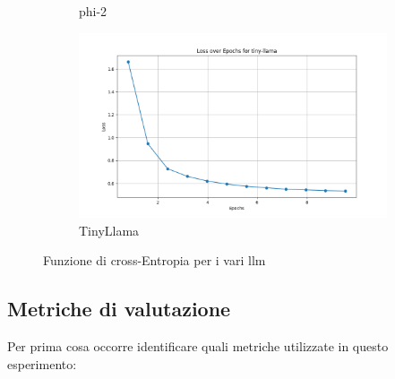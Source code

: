 \begin{figure}[ht]
\begin{subfigure}{0.33\textwidth}
		\caption{phi-2}
	\end{subfigure}%
 	\begin{subfigure}{0.33\textwidth}
		\includegraphics[width=1.0\textwidth]{Immagini/train_loss/tiny-llama-loss_plot.png}
		\caption{TinyLlama}
	\end{subfigure}
	\caption{Funzione di cross-Entropia per i vari llm}
	\label{fig:llm-loss_function}
\end{figure}



\subsection{Metriche di valutazione}\label{sec:hpc_unipr_evaluation_metrics}
Per prima cosa occorre identificare quali metriche utilizzate in questo esperimento:




